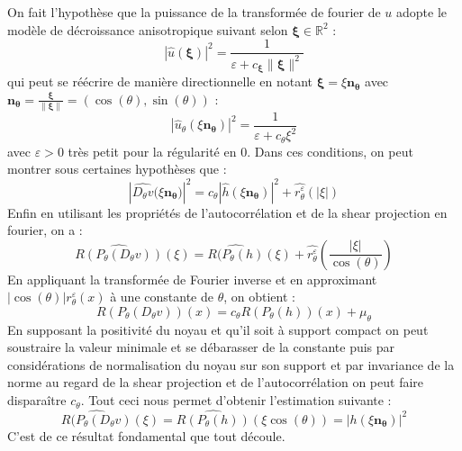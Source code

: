 \documentclass[a4paper,11pt]{article}
\begin{document}
On fait l'hypothèse que la puissance de la transformée de fourier de $u$ adopte le modèle de décroissance anisotropique suivant selon $\boldsymbol{\xi} \in \mathbb{R}^2$ : 
$$|\hat{u}(\boldsymbol{\xi})|^2 = \frac{1}{\varepsilon + c_{\boldsymbol{\xi}}\|\boldsymbol{\xi}\|^2}$$
qui peut se réécrire de manière directionnelle en notant $\boldsymbol{\xi}= \xi \boldsymbol{n_{\theta}}$ avec $\boldsymbol{n_{\theta}} = \frac{\boldsymbol{\xi}}{\|\bm{\xi}\|} = (\cos(\theta),\sin(\theta))$ : 
$$| \hat{u}_{\theta}(\xi\bm{n_{\theta}})|^2 = \frac{1}{\varepsilon + c_{\theta}\xi^2}$$
avec $\varepsilon>0$ très petit pour la régularité en $0$. Dans ces conditions, on peut montrer sous certaines hypothèses que : 
$$\left|\widehat{D_{\theta}v}(\xi\bm{n_{\theta})}\right|^2 = c_{\theta}|\hat{h}(\xi\bm{n_{\theta}})|^2 + \hat{r_{\theta}^{\varepsilon}}(|\xi|)$$
Enfin en utilisant les propriétés de l'autocorrélation et de la shear projection en fourier, on a : 
$$\widehat{R(P_{\theta}(D_{\theta}v))}(\xi) = \widehat{R(P_{\theta}(h)}(\xi) + \hat{r_{\theta}^{\varepsilon}}\left(\frac{|\xi|}{\cos(\theta)}\right)$$
En appliquant la transformée de Fourier inverse et en approximant $|\cos(\theta)|r_{\theta}^{\varepsilon}(x)$ à une constante de $\theta$, on obtient : 
$$R(P_{\theta}(D_{\theta}v))(x) = c_{\theta}R(P_{\theta}(h))(x) + \mu_{\theta}$$
En supposant la positivité du noyau et qu'il soit à support compact on peut soustraire la valeur minimale et se débarasser de la constante puis par considérations de normalisation du noyau sur son support et par invariance de la norme au regard de la shear projection et de l'autocorrélation on peut faire disparaître $c_{\theta}$. Tout ceci nous permet d'obtenir l'estimation suivante : 
$$\widehat{R(P_{\theta}(D_{\theta}v)}(\xi) = \widehat{R(P_{\theta}(h))}(\xi\cos(\theta)) =  |h(\xi\bm{n_{\theta}})|^2$$
C'est de ce résultat fondamental que tout découle.
\end{document}
